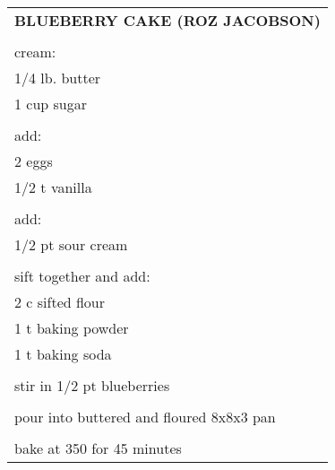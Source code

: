 \documentclass[8pt]{report}
\begin{document}
\newpage

\centering

\begin{tabular}{|l|} \hline	%
 
\multicolumn{1}{|c|}{\textbf{BLUEBERRY CAKE (ROZ JACOBSON)}}
\\
\\

\index{desserts!blueberry cake (roz jacobson)} \index{blueberry cake}

cream:\\
\hspace{0.5 in} 	1/4 lb. butter\\
\hspace{0.5 in} 	1 cup sugar\\
\\
add:\\
\hspace{0.5 in} 	2 eggs\\
\hspace{0.5 in} 	1/2 t vanilla\\
\\
add:\\
\hspace{0.5 in} 	1/2 pt sour cream\\
\\
sift together and add:\\
\hspace{0.5 in} 	2 c sifted flour\\
\hspace{0.5 in} 	1 t baking powder\\
\hspace{0.5 in} 	1 t baking soda\\
\\
stir in 1/2 pt blueberries\\
\\
pour into buttered and floured 8x8x3 pan\\
\\
bake at 350 for 45 minutes\\
\hline

\end{tabular}

\newpage

\centering
\end{document}
